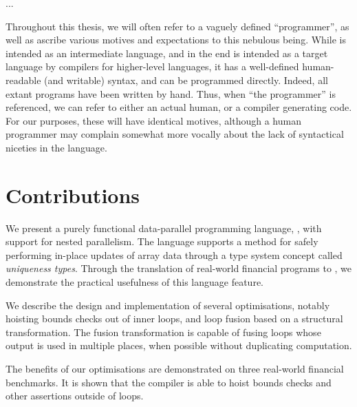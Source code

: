 ... 

Throughout this thesis, we will often refer to a vaguely defined
``programmer'', as well as ascribe various motives and expectations to
this nebulous being.  While \LO{} is intended as an intermediate
language, and in the end is intended as a target language by compilers
for higher-level languages, it has a well-defined human-readable (and
writable) syntax, and can be programmed directly.  Indeed, all extant
\LO{} programs have been written by hand.  Thus, when ``the
programmer'' is referenced, we can refer to either an actual human, or
a compiler generating \LO{} code.  For our purposes, these will have
identical motives, although a human programmer may complain somewhat
more vocally about the lack of syntactical niceties in the language.

\section{Contributions}

We present a purely functional data-parallel programming language,
\LO{}, with support for nested parallelism.  The language supports a
method  for safely performing in-place updates of array
data through a type system concept called \textit{uniqueness types}.
Through the translation of real-world financial programs to \LO{}, we
demonstrate the practical usefulness of this language feature.

We describe the design and implementation of several optimisations,
notably hoisting bounds checks out of inner loops, and loop fusion
based on a structural transformation.  The fusion transformation is
capable of fusing loops whose output is used in multiple places, when
possible without duplicating computation.

The benefits of our optimisations are demonstrated on three real-world
financial benchmarks.  It is shown that the compiler is able to hoist
bounds checks and other assertions outside of loops.

